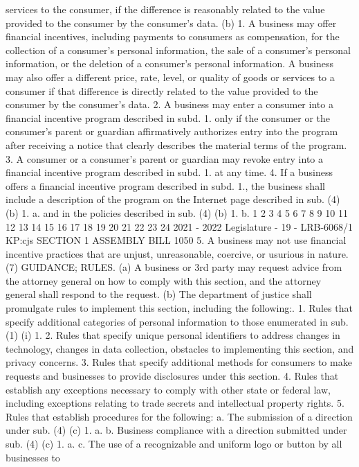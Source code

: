 services to the consumer, if the difference is reasonably related to the value provided
to the consumer by the consumer's data.
(b) 1. A business may offer financial incentives, including payments to
consumers as compensation, for the collection of a consumer's personal information,
the sale of a consumer's personal information, or the deletion of a consumer's
personal information. A business may also offer a different price, rate, level, or
quality of goods or services to a consumer if that difference is directly related to the
value provided to the consumer by the consumer's data.
2. A business may enter a consumer into a financial incentive program
described in subd. 1. only if the consumer or the consumer's parent or guardian
affirmatively authorizes entry into the program after receiving a notice that clearly
describes the material terms of the program.
3. A consumer or a consumer's parent or guardian may revoke entry into a
financial incentive program described in subd. 1. at any time.
4. If a business offers a financial incentive program described in subd. 1., the
business shall include a description of the program on the Internet page described
in sub. (4) (b) 1. a. and in the policies described in sub. (4) (b) 1. b.
1
2
3
4
5
6
7
8
9
10
11
12
13
14
15
16
17
18
19
20
21
22
23
24
2021 - 2022 Legislature - 19 - LRB-6068/1
KP:cjs
SECTION 1 ASSEMBLY BILL 1050
5. A business may not use financial incentive practices that are unjust,
unreasonable, coercive, or usurious in nature.
(7) GUIDANCE; RULES. (a) A business or 3rd party may request advice from the
attorney general on how to comply with this section, and the attorney general shall
respond to the request.
(b) The department of justice shall promulgate rules to implement this section,
including the following:.
1. Rules that specify additional categories of personal information to those
enumerated in sub. (1) (i) 1.
2. Rules that specify unique personal identifiers to address changes in
technology, changes in data collection, obstacles to implementing this section, and
privacy concerns.
3. Rules that specify additional methods for consumers to make requests and
businesses to provide disclosures under this section.
4. Rules that establish any exceptions necessary to comply with other state or
federal law, including exceptions relating to trade secrets and intellectual property
rights.
5. Rules that establish procedures for the following:
a. The submission of a direction under sub. (4) (c) 1. a.
b. Business compliance with a direction submitted under sub. (4) (c) 1. a.
c. The use of a recognizable and uniform logo or button by all businesses to
